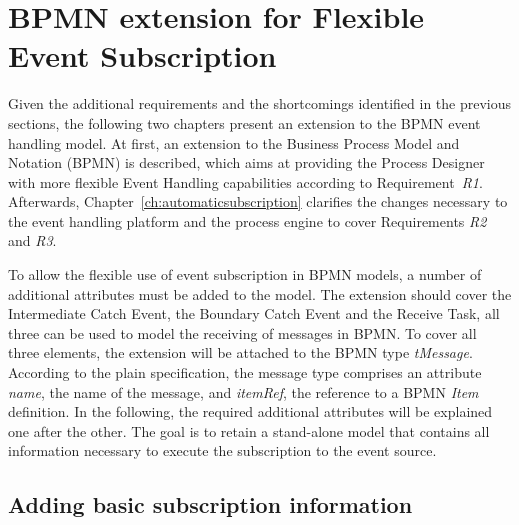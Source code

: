 \chapter{BPMN extension for Flexible Event Subscription}\label{ch:flexibleeventsubscription}

Given the additional requirements and the shortcomings identified in the previous sections, the following two chapters present an extension to the BPMN event handling model.
At first, an extension to the Business Process Model and Notation (BPMN) is described, which aims at providing the Process Designer with more flexible Event Handling capabilities according to Requirement~\textit{R1}.
Afterwards, Chapter~\autoref{ch:automaticsubscription} clarifies the changes necessary to the event handling platform and the process engine to cover Requirements \textit{R2} and \textit{R3}.

To allow the flexible use of event subscription in BPMN models, a number of additional attributes must be added to the model. 
The extension should cover the Intermediate Catch Event, the Boundary Catch Event and the Receive Task, all three can be used to model the receiving of messages in BPMN.
To cover all three elements, the extension will be attached to the BPMN type \textit{tMessage}. 
According to the plain specification, the message type comprises an attribute \textit{name}, the name of the message, and \textit{itemRef}, the reference to a BPMN \textit{Item} definition. 
In the following, the required additional attributes will be explained one after the other. The goal is to retain a stand-alone model that contains all information necessary to execute the subscription to the event source.

\section{Adding basic subscription information}

